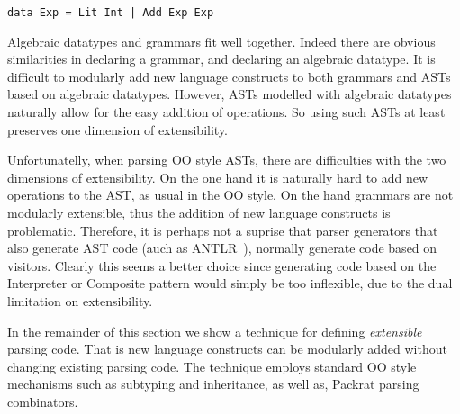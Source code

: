 \begin{lstlisting} 
data Exp = Lit Int | Add Exp Exp
\end{lstlisting}

Algebraic datatypes and grammars fit well together. Indeed there are
obvious similarities in declaring a grammar, and declaring an
algebraic datatype. It is difficult to modularly add new language
constructs to both grammars and ASTs based on algebraic datatypes. However,
ASTs modelled with algebraic datatypes naturally allow for the easy
addition of operations. So using such ASTs at least preserves one
dimension of extensibility.

Unfortunatelly, when parsing OO style ASTs, there are difficulties with
the two dimensions of extensibility. On the one hand it is naturally hard to 
add new operations to the AST, as usual in the OO style. On the hand 
grammars are not modularly extensible, thus the addition of new
language constructs is problematic. Therefore,
it is perhaps not a suprise that parser generators that also generate 
AST code (auch as ANTLR~\cite{}), normally generate code based on 
visitors. Clearly this seems a better choice since generating code 
based on the {\sc Interpreter} or {\sc Composite} pattern would 
simply be too inflexible, due to the dual limitation on extensibility.

In the remainder of this section we show a technique for 
defining \emph{extensible} parsing code. That is new 
language constructs can be modularly added without changing 
existing parsing code. The technique employs standard OO 
style mechanisms such as subtyping and inheritance, as well as, 
Packrat parsing combinators.


